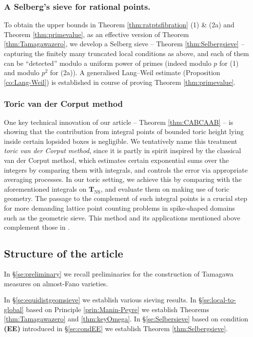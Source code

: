 \documentclass[11pt,letterpaper]{amsart}
\newcommand{\CTNS}{\mathbf{T}_{\operatorname{NS}}}
\theoremstyle{plain}
\numberwithin{equation}{section}
\theoremstyle{definition}
\theoremstyle{remark}
\begin{document}
\subsubsection{A Selberg's sieve for rational points.} To obtain the upper bounds in Theorem \ref{thm:ratptsfibration} (1) \& (2a) and Theorem \ref{thm:primevalue}, as an effective version of Theorem \ref{thm:Tamagawazero}, we develop a Selberg sieve -- Theorem \ref{thm:Selbergsieve} -- capturing the  finitely many  truncated local conditions as above, and each of them can be ``detected'' modulo a uniform power of primes (indeed modulo $p$ for (1) and modulo $p^2$ for (2a)). A generalised Lang--Weil estimate (Proposition \ref{co:Lang-Weil}) is established in course of proving Theorem \ref{thm:primevalue}.


\subsubsection{Toric van der Corput method}
One key technical innovation of our article -- Theorem \ref{thm:CABCAAB} -- is showing that the contribution from integral points of bounded toric height lying inside certain lopsided boxes is negligible. We tentatively name this treatment \emph{toric van der Corput method}, since it is partly in spirit inspired by the classical van der Corput method, which estimates certain exponential sums over the integers by comparing them with integrals, and controls the error via appropriate averaging processes. In our toric setting, we achieve this by comparing with the aforementioned integrals on $\CTNS$, and evaluate them on making use of toric geometry.
The passage to the complement of such integral points is a crucial step for more demanding lattice point counting problems in spike-shaped domains such as the geometric sieve. This method and its applications mentioned above complement those in \cite[\S11]{Salberger}.

\subsection{Structure of the article}
In \S\ref{se:preliminary} we recall preliminaries for the construction of Tamagawa measures on almost-Fano varieties. 

In \S\ref{se:equidistgeomsieve} we establish various sieving results. In  \S\ref{se:local-to-global} based on Principle \ref{prin:Manin-Peyre} we establish Theorems \ref{thm:Tamagawazero} and \ref{thm:keyOmega}. In \S\ref{se:Selbersieve} based on condition \textbf{(EE)} introduced in \S\ref{se:condEE} we establish Theorem \ref{thm:Selbergsieve}.
\end{document}

